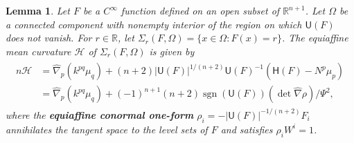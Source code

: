 \documentclass [leqno, 10pt]{amsart}
\newtheorem{lemma}[theorem]{Lemma}
\theoremstyle{definition}
\numberwithin{equation}{section}
\newcommand{\muf}{\mu}
\newcommand{\amc}{\mathcal{H}}
\newcommand{\Om}{\Omega}
\newcommand{\U}{\mathsf{U}}
\newcommand{\lc}{\Sigma}
\renewcommand{\H}{\mathsf{H}}
\newcommand{\cinf}{C^{\infty}}
\newcommand{\sign}{\operatorname{sgn}}
\newcommand{\hnabla}{\widehat{\nabla}}
\newcommand{\rea}{\mathbb R}
\begin{document}
\begin{lemma}\label{amclemma}
Let $F$ be a $\cinf$ function defined on an open subset of $\rea^{n+1}$. Let $\Omega$ be a connected component with nonempty interior of the region on which $\U(F)$ does not vanish. For $r \in \rea$, let $\lc_{r}(F, \Omega) = \{x \in \Omega: F(x) = r\}$. The equiaffine mean curvature $\amc$ of $\lc_{r}(F, \Om)$ is given by
\begin{align}\label{amc}
\begin{split}
n\amc &= \hnabla_{p}(k^{pq}\muf_{q}) + (n+2)|\U(F)|^{1/(n+2)}\U(F)^{-1}(\H(F) - N^{p}\muf_{p})\\
& =  \hnabla_{p}(k^{pq}\muf_{q}) + (-1)^{n+1}(n+2)\sign(\U(F))(\det \hnabla \rho) /\Psi^{2},
\end{split}
\end{align}
where  the \textbf{equiaffine conormal one-form} $\rho_{i} = -|\U(F)|^{-1/(n+2)}F_{i}$ annihilates the tangent space to the level sets of $F$ and satisfies $\rho_{i}W^{i} = 1$.
\end{lemma}
\end{document}
